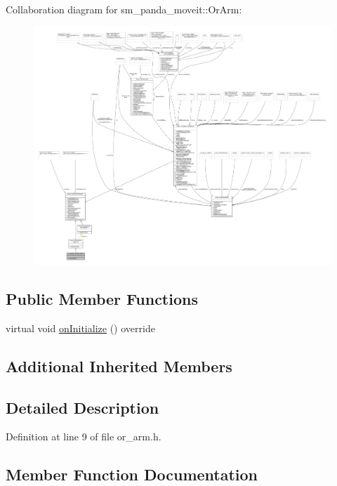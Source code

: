Collaboration diagram for sm\+\_\+panda\+\_\+moveit\+:\+:Or\+Arm\+:
\nopagebreak
\begin{figure}[H]
\begin{center}
\leavevmode
\includegraphics[width=350pt]{classsm__panda__moveit_1_1OrArm__coll__graph}
\end{center}
\end{figure}
\subsection*{Public Member Functions}
\begin{DoxyCompactItemize}
\item 
virtual void \hyperlink{classsm__panda__moveit_1_1OrArm_a3c2576b9679bd5660f9058de17b73956}{on\+Initialize} () override
\end{DoxyCompactItemize}
\subsection*{Additional Inherited Members}


\subsection{Detailed Description}


Definition at line 9 of file or\+\_\+arm.\+h.



\subsection{Member Function Documentation}
\mbox{\label{classsm__panda__moveit_1_1OrArm_a3c2576b9679bd5660f9058de17b73956}} 
